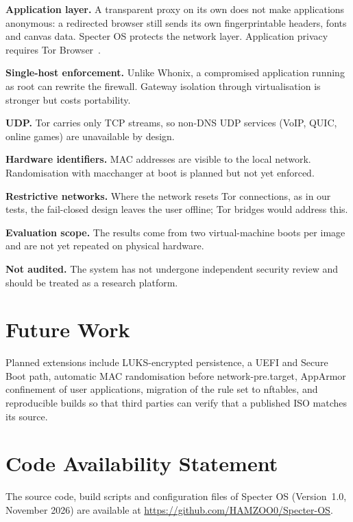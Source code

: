 \documentclass[10pt,twocolumn,a4paper]{article}
\DeclareRobustCommand{\texttt}[1]{\mbox{\ttfamily #1}}
\begin{document}
\textbf{Application layer.} A transparent proxy on its own does not make
applications anonymous: a redirected browser still sends its own fingerprintable headers, fonts
and canvas data. Specter OS protects the network layer. Application
privacy requires Tor Browser~\cite{torbrowser}.

\textbf{Single-host enforcement.} Unlike Whonix, a compromised
application running as root can rewrite the firewall. Gateway
isolation through virtualisation is stronger but costs portability.

\textbf{UDP.} Tor carries only TCP streams, so non-DNS UDP services
(VoIP, QUIC, online games) are unavailable by design.

\textbf{Hardware identifiers.} MAC addresses are visible to the local
network. Randomisation with \texttt{macchanger} at boot is planned but
not yet enforced.

\textbf{Restrictive networks.} Where the network resets Tor connections,
as in our tests, the fail-closed design leaves the user offline; Tor
bridges would address this.

\textbf{Evaluation scope.} The results come from two virtual-machine
boots per image and are not yet repeated on physical hardware.

\textbf{Not audited.} The system has not undergone independent security
review and should be treated as a research platform.

\section{Future Work}
\label{sec:future}
Planned extensions include LUKS-encrypted persistence, a UEFI
and Secure Boot path, automatic MAC randomisation before
\texttt{network-pre.target}, AppArmor confinement of user applications,
migration of the rule set to \texttt{nftables}, and reproducible builds
so that third parties can verify that a published ISO matches its
source.

\section*{Code Availability Statement}
The source code, build scripts and configuration files of Specter OS
(Version~1.0, November 2026) are available at
\url{https://github.com/HAMZOO0/Specter-OS}.
\end{document}
